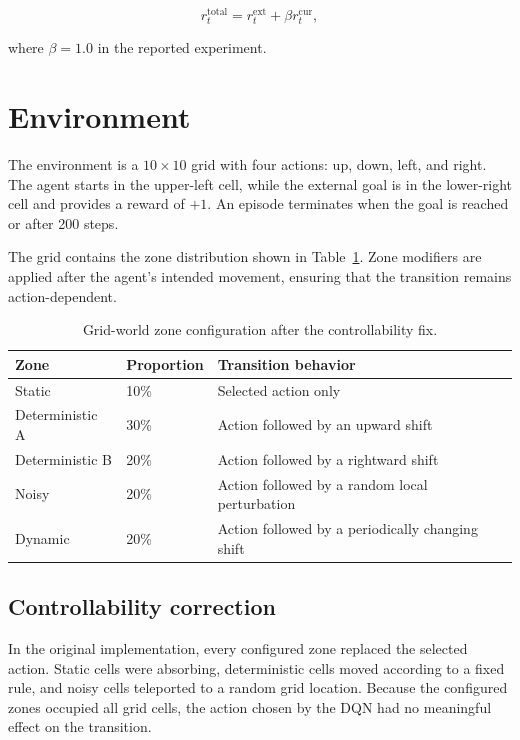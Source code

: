 \documentclass[11pt,a4paper]{article}
\begin{document}
\begin{equation}
    r^{\mathrm{total}}_t =
    r^{\mathrm{ext}}_t + \beta r^{\mathrm{cur}}_t,
\end{equation}

where $\beta=1.0$ in the reported experiment.

\section{Environment}

The environment is a $10\times10$ grid with four actions: up, down, left, and
right. The agent starts in the upper-left cell, while the external goal is in
the lower-right cell and provides a reward of $+1$. An episode terminates when
the goal is reached or after 200 steps.

The grid contains the zone distribution shown in
Table~\ref{tab:zones}. Zone modifiers are applied after the agent's intended
movement, ensuring that the transition remains action-dependent.

\begin{table}[ht]
    \centering
    \caption{Grid-world zone configuration after the controllability fix.}
    \label{tab:zones}
    \begin{tabular}{lll}
        \toprule
        Zone & Proportion & Transition behavior \\
        \midrule
        Static          & 10\% & Selected action only \\
        Deterministic A & 30\% & Action followed by an upward shift \\
        Deterministic B & 20\% & Action followed by a rightward shift \\
        Noisy           & 20\% & Action followed by a random local perturbation \\
        Dynamic         & 20\% & Action followed by a periodically changing shift \\
        \bottomrule
    \end{tabular}
\end{table}

\subsection{Controllability correction}

In the original implementation, every configured zone replaced the selected
action. Static cells were absorbing, deterministic cells moved according to a
fixed rule, and noisy cells teleported to a random grid location. Because the
configured zones occupied all grid cells, the action chosen by the DQN had no
meaningful effect on the transition.
\end{document}
